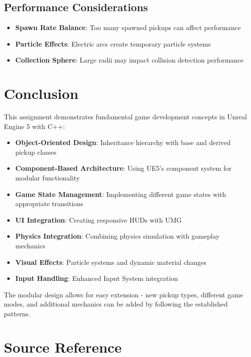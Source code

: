 \documentclass[
  letterpaper,
  DIV=11,
  numbers=noendperiod]{scrartcl}
\providecommand{\tightlist}{%
  \setlength{\itemsep}{0pt}\setlength{\parskip}{0pt}}
\begin{document}
\subsection{Performance
Considerations}\label{performance-considerations}

\begin{itemize}
\tightlist
\item
  \textbf{Spawn Rate Balance}: Too many spawned pickups can affect
  performance
\item
  \textbf{Particle Effects}: Electric arcs create temporary particle
  systems
\item
  \textbf{Collection Sphere}: Large radii may impact collision detection
  performance
\end{itemize}

\section{Conclusion}\label{conclusion}

This assignment demonstrates fundamental game development concepts in
Unreal Engine 5 with C++:

\begin{itemize}
\tightlist
\item
  \textbf{Object-Oriented Design}: Inheritance hierarchy with base and
  derived pickup classes
\item
  \textbf{Component-Based Architecture}: Using UE5's component system
  for modular functionality
\item
  \textbf{Game State Management}: Implementing different game states
  with appropriate transitions
\item
  \textbf{UI Integration}: Creating responsive HUDs with UMG
\item
  \textbf{Physics Integration}: Combining physics simulation with
  gameplay mechanics
\item
  \textbf{Visual Effects}: Particle systems and dynamic material changes
\item
  \textbf{Input Handling}: Enhanced Input System integration
\end{itemize}

The modular design allows for easy extension - new pickup types,
different game modes, and additional mechanics can be added by following
the established patterns.

\section{Source Reference}\label{source-reference}
\end{document}
